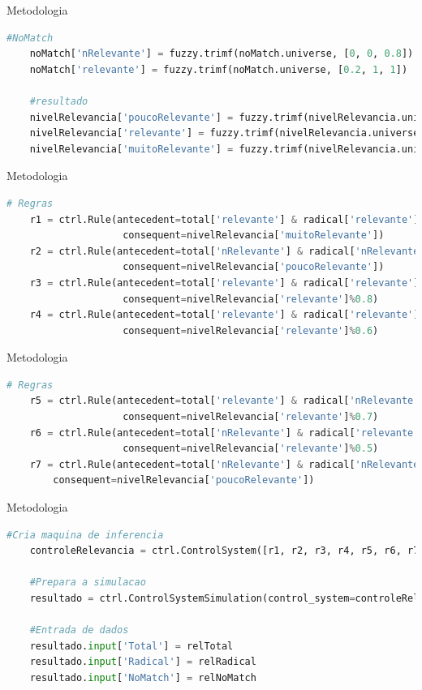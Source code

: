 \documentclass{beamer}
\begin{document}
	\begin{frame}[fragile]{Metodologia}
\begin{lstlisting}[language=Python, caption = Lógica Fuzzy(cont.)]	
	#NoMatch
	noMatch['nRelevante'] = fuzzy.trimf(noMatch.universe, [0, 0, 0.8])
	noMatch['relevante'] = fuzzy.trimf(noMatch.universe, [0.2, 1, 1])
	
	#resultado
	nivelRelevancia['poucoRelevante'] = fuzzy.trimf(nivelRelevancia.universe, [0, 0, 0.4])
	nivelRelevancia['relevante'] = fuzzy.trimf(nivelRelevancia.universe, [0.1, 0.5, 0.9])
	nivelRelevancia['muitoRelevante'] = fuzzy.trimf(nivelRelevancia.universe, [0.6, 1, 1])
\end{lstlisting}
	\end{frame}	

	\begin{frame}[fragile]{Metodologia}
\begin{lstlisting}[language=Python, caption = Lógica Fuzzy(cont.)]	
	# Regras
	r1 = ctrl.Rule(antecedent=total['relevante'] & radical['relevante'] & noMatch['nRelevante'],
					consequent=nivelRelevancia['muitoRelevante'])
	r2 = ctrl.Rule(antecedent=total['nRelevante'] & radical['nRelevante'] & noMatch['relevante'],
					consequent=nivelRelevancia['poucoRelevante'])
	r3 = ctrl.Rule(antecedent=total['relevante'] & radical['relevante'] & noMatch['nRelevante'],
					consequent=nivelRelevancia['relevante']%0.8)
	r4 = ctrl.Rule(antecedent=total['relevante'] & radical['relevante'] & noMatch['relevante'],
					consequent=nivelRelevancia['relevante']%0.6)

\end{lstlisting}
	\end{frame}	

	\begin{frame}[fragile]{Metodologia}
\begin{lstlisting}[language=Python, caption = Lógica Fuzzy(cont.)]	
	# Regras
	r5 = ctrl.Rule(antecedent=total['relevante'] & radical['nRelevante'] & noMatch['nRelevante'],
					consequent=nivelRelevancia['relevante']%0.7)
	r6 = ctrl.Rule(antecedent=total['nRelevante'] & radical['relevante'] & noMatch['nRelevante'],
					consequent=nivelRelevancia['relevante']%0.5)
	r7 = ctrl.Rule(antecedent=total['nRelevante'] & radical['nRelevante'] & noMatch['nRelevante'],
		consequent=nivelRelevancia['poucoRelevante'])
\end{lstlisting}
	\end{frame}	

	\begin{frame}[fragile]{Metodologia}
\begin{lstlisting}[language=Python, caption = Lógica Fuzzy(cont.)]	
	#Cria maquina de inferencia
	controleRelevancia = ctrl.ControlSystem([r1, r2, r3, r4, r5, r6, r7])
	
	#Prepara a simulacao
	resultado = ctrl.ControlSystemSimulation(control_system=controleRelevancia)
	
	#Entrada de dados
	resultado.input['Total'] = relTotal
	resultado.input['Radical'] = relRadical
	resultado.input['NoMatch'] = relNoMatch
\end{lstlisting}
	\end{frame}	
\end{document}
